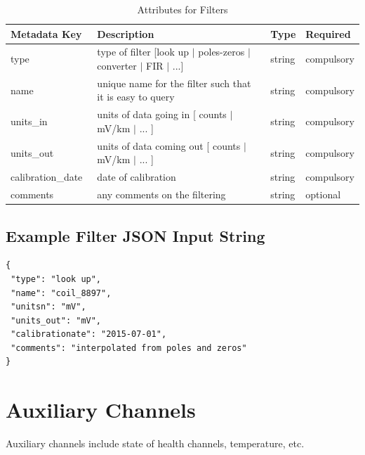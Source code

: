 \documentclass{article}
\begin{document}
\begin{table}[htb!]
    \caption[Attributes for Filter]{Attributes for Filters}
    \begin{tabular}{|l|p{3.5in}|l|l|}
        \hline
        \textbf{Metadata Key} & \textbf{Description} & \textbf{Type} & \textbf{Required} \\ \hline
        type\ & type of filter [look up $|$ poles-zeros $|$ converter $|$ FIR $|$ ...]& string &  compulsory \\ \hline
        name\ & unique name for the filter such that it is easy to query & string & compulsory \\ \hline
        units\_in\ & units of data going in [ counts $|$ mV/km $|$ ... ] & string & compulsory \\ \hline
        units\_out\ & units of data coming out [ counts $|$ mV/km $|$ ... ] & string & compulsory \\ \hline
        calibration\_date\ & date of calibration & string &  compulsory \\ \hline
        comments\ & any comments on the filtering & string &  optional \\ \hline
    \end{tabular}
    \label{tab:filter}
\end{table}

\subsection{Example Filter JSON Input String} 

\begin{verbatim}
{
 "type": "look up",
 "name": "coil_8897",
 "unitsn": "mV",
 "units_out": "mV",
 "calibrationate": "2015-07-01",
 "comments": "interpolated from poles and zeros"
}
\end{verbatim}

\newpage

\section{Auxiliary Channels}

Auxiliary channels include state of health channels, temperature, etc.  
\end{document}
